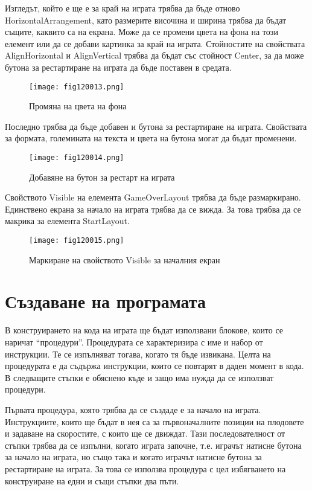 Изгледът, който е ще е за край на играта трябва да бъде отново HorizontalArrangement, като размерите височина и ширина трябва да бъдат същите, каквито са на екрана. Може да се промени цвета на фона на този елемент или да се добави картинка за край на играта. Стойностите на свойствата AlignHorizontal и AlignVertical трябва да бъдат със стойност Center, за да може бутона за рестартиране на играта да бъде поставен в средата.

\begin{figure}[H]
  \centering
  \texttt{[image: fig120013.png]}
  \caption{Промяна на цвета на фона}
\label{fig120013}
\end{figure}

Последно трябва да бъде добавен и бутона за рестартиране на играта. Свойствата за формата, големината на текста и цвета на бутона могат да бъдат променени.

\begin{figure}[H]
  \centering
  \texttt{[image: fig120014.png]}
  \caption{Добавяне на бутон за рестарт на играта}
\label{fig120014}
\end{figure}

Свойството Visible на елемента GameOverLayout трябва да бъде размаркирано. Единствено екрана за начало на играта трябва да се вижда. За това трябва да се макрика за елемента StartLayout.

\begin{figure}[H]
  \centering
  \texttt{[image: fig120015.png]}
  \caption{Маркиране на свойството Visible за началния екран}
\label{fig120015}
\end{figure}

\section{Създаване на програмата}
В конструирането на кода на играта ще бъдат използвани блокове, които се наричат “процедури”. Процедурата се характеризира с име и набор от инструкции. Те се изпълняват тогава, когато тя бъде извикана. Целта на процедурата е да съдържа инструкции, които се повтарят в даден момент в кода. В следващите стъпки е обяснено къде и защо има нужда да се използват процедури.

Първата процедура, която трябва да се създаде е за начало на играта. Инструкциите, които ще бъдат в нея са за първоначалните позиции на плодовете и задаване на скоростите, с които ще се движдат. Тази последователност от стъпки трябва да се изпълни, когато играта започне, т.е. играчът натисне бутона за начало на играта, но също така и когато играчът натисне бутона за рестартиране на играта. За това се използва процедура с цел избягването на конструиране на едни и същи стъпки два пъти.

